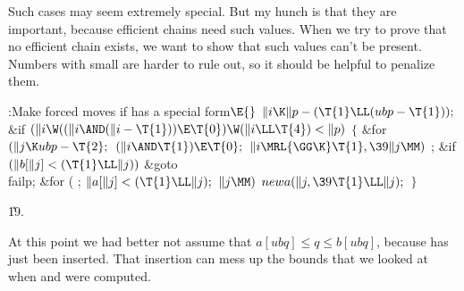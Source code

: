 Such cases may seem extremely special. But my hunch is that they are
important, because efficient chains need such values. When we try
to prove that no efficient chain exists, we want to show that
such values can't be present. Numbers with small  are harder
to rule out, so it should be helpful to penalize them.

\Y\B\4:Make forced moves if  has a special form\X${}\E{}$\6
$\|i\K\|p-(\T{1}\LL(\\{ubp}-\T{1}));{}$\6
\&{if} ${}(\|i\W((\|i\AND(\|i-\T{1}))\E\T{0})\W(\|i\LL\T{4})<\|p){}$\5
${}\{{}$\1\6
\&{for} ${}(\|j\K\\{ubp}-\T{2};{}$ ${}(\|i\AND\T{1})\E\T{0};{}$ ${}\|i\MRL{{%
\GG}{\K}}\T{1},\39\|j\MM){}$\1\5
;\2\6
\&{if} ${}(\|b[\|j]<(\T{1}\LL\|j)){}$\1\5
\&{goto} \\{failp};\2\6
\&{for} ( ; ${}\|a[\|j]<(\T{1}\LL\|j);{}$ ${}\|j\MM){}$\1\5
${}\\{newa}(\|j,\39\T{1}\LL\|j);{}$\2\6
\4${}\}{}$\2\par
\U19.\fi

At this point we had better not assume that $a[ubq]\le q\le b[ubq]$,
because  has just been inserted. That insertion can mess up the
bounds that we looked at when  and  were computed.

